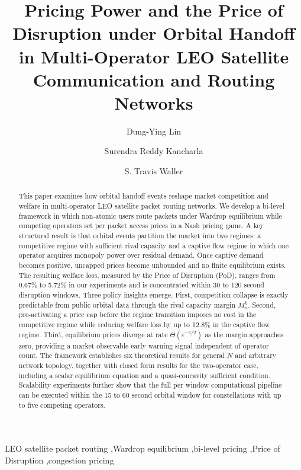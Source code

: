 \documentclass[review,3p,authoryear]{elsarticle}
\begin{document}
\begin{frontmatter}

\title{Pricing Power and the Price of Disruption under Orbital Handoff in Multi-Operator LEO Satellite Communication and Routing Networks}
\author[a]{Dung-Ying Lin}
\author[b]{Surendra Reddy Kancharla} 

\author[b]{S. Travis Waller}


\address[a]{Department of Industrial Engineering and Engineering Management, National Tsing Hua University (NTHU), Taiwan}
\address[b]{"Friedrich List" Faculty of Transport and Traffic Sciences, Technische Universität Dresden, Saxony, Germany, 01069}

\begin{abstract}
This paper examines how orbital handoff events reshape market competition and welfare in multi-operator LEO satellite packet routing networks. We develop a bi-level framework in which non-atomic users route packets under Wardrop equilibrium while competing operators set per packet access prices in a Nash pricing game. A key structural result is that orbital events partition the market into two regimes: a competitive regime with sufficient rival capacity and a captive flow regime in which one operator acquires monopoly power over residual demand. Once captive demand becomes positive, uncapped prices become unbounded and no finite equilibrium exists. The resulting welfare loss, measured by the Price of Disruption (PoD), ranges from 0.67\% to 5.72\% in our experiments and is concentrated within 30 to 120 second disruption windows. Three policy insights emerge. First, competition collapse is exactly predictable from public orbital data through the rival capacity margin $M_{n}^{k}$. Second, pre-activating a price cap before the regime transition imposes no cost in the competitive regime while reducing welfare loss by up to 12.8\% in the captive flow regime. Third, equilibrium prices diverge at rate ${\Theta} \left({\varepsilon}^{-1/2}\right)$ as the margin approaches zero, providing a market observable early warning signal independent of operator count. The framework establishes six theoretical results for general $N$ and arbitrary network topology, together with closed form results for the two-operator case, including a scalar equilibrium equation and a quasi-concavity sufficient condition. Scalability experiments further show that the full per window computational pipeline can be executed within the 15 to 60 second orbital window for constellations with up to five competing operators.
\end{abstract}
\begin{keyword}
LEO satellite packet routing \sep Wardrop equilibrium \sep bi-level pricing \sep Price of Disruption \sep congestion pricing
\end{keyword}
\end{frontmatter}
\end{document}
